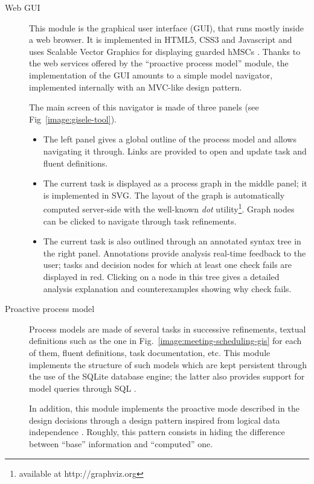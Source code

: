 \begin{description}
\item[Web GUI] This module is the graphical user interface (GUI), that runs mostly inside a web browser. It is implemented in HTML5, CSS3 and Javascript \cite{Pilgrim:2011} and uses Scalable Vector Graphics for displaying guarded hMSCs \cite{Eisenberg:2002}. Thanks to the web services offered by the ``proactive process model'' module, the implementation of the GUI amounts to a simple model navigator, implemented internally with an MVC-like design pattern. 

The main screen of this navigator is made of three panels (see Fig~\ref{image:gisele-tool}). 
\begin{itemize}
\item The left panel gives a global outline of the process model and allows navigating it through. Links are provided to open and update task and fluent definitions.
\item The current task is displayed as a process graph in the middle panel; it is implemented in SVG. The layout of the graph is automatically computed server-side with the well-known \emph{dot} utility\footnote{available at http://graphviz.org}. Graph nodes can be clicked to navigate through task refinements.
\item The current task is also outlined through an annotated syntax tree in the right panel. Annotations provide analysis real-time feedback to the user; tasks and decision nodes for which at least one check fails are displayed in red. Clicking on a node in this tree gives a detailed analysis explanation and counterexamples showing why check fails.
\end{itemize}

\item[Proactive process model] Process models are made of several tasks in successive refinements, textual definitions such as the one in Fig.~\ref{image:meeting-scheduling-gis} for each of them, fluent definitions, task documentation, etc. This module implements the structure of such models which are kept persistent through the use of the SQLite database engine; the latter also provides support for model queries through SQL \cite{Date:1997}.

In addition, this module implements the proactive mode described in the design decisions through a design pattern inspired from logical data independence \cite{Date:2003}. Roughly, this pattern consists in hiding the difference between ``base'' information and ``computed'' one.


\end{description}
